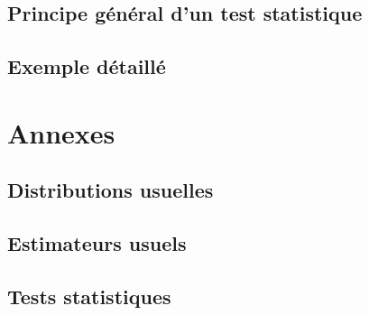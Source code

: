 \documentclass[
]{book}
\begin{document}
\section{Principe général d'un test statistique}\label{principe-guxe9nuxe9ral-dun-test-statistique}

\section{Exemple détaillé}\label{exemple-duxe9tailluxe9}

\chapter{Annexes}\label{annexes}

\section{Distributions usuelles}\label{annexe:distributions}

\section{Estimateurs usuels}\label{annexe:estimateurs}

\section{Tests statistiques}\label{annexe:tests}

  
\end{document}
